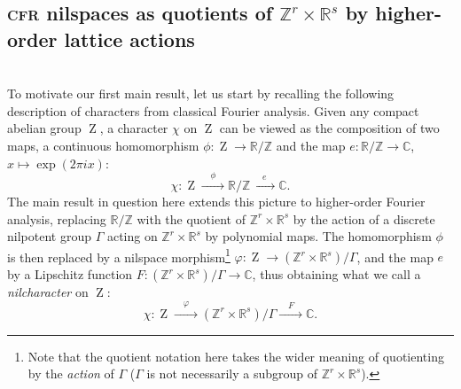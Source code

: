 \documentclass[a4paper,12pt,reqno]{amsart}
\theoremstyle{definition}
\def\to{\rightarrow}
\newcommand{\mb}{\mathbb}
\DeclareMathOperator{\ab}{Z}
\begin{document}
\subsection{\textsc{cfr} nilspaces as quotients of $\mb{Z}^r\times \mb{R}^s$ by higher-order lattice actions}\hfill\\
To motivate our first main result, let us start by recalling the following description of characters from classical Fourier analysis. Given any compact abelian group $\ab$, a character $\chi$ on $\ab$ can be viewed as the composition of two maps, a continuous homomorphism $\phi:\ab\to \mb{R}/\mb{Z}$ and the map $e:\mb{R}/\mb{Z}\to \mb{C}$, $x\mapsto \exp(2\pi i x)$:
\[
\chi:\ab \xrightarrow{\quad\phi\quad} \mb{R}/\mb{Z} \xrightarrow{\quad e\quad} \mb{C}.
\]
The main result in question here extends this picture to higher-order Fourier analysis, replacing $\mb{R}/\mb{Z}$ with the quotient of $\mb{Z}^r\times\mb{R}^s$ by the action of a discrete nilpotent group $\Gamma$ acting on $\mb{Z}^r\times\mb{R}^s$ by polynomial maps. The homomorphism $\phi$ is then replaced by a nilspace morphism\footnote{Note that the quotient notation here takes the wider meaning of quotienting by the \emph{action} of $\Gamma$ ($\Gamma$ is not necessarily a subgroup of $\mb{Z}^r\times\mb{R}^s$).} $\varphi:\ab\to (\mb{Z}^r\times\mb{R}^s)/\Gamma$, and the map $e$ by a Lipschitz function $F:(\mb{Z}^r\times\mb{R}^s)/\Gamma\to \mb{C}$, thus obtaining what we call a \emph{nilcharacter} on $\ab$:
\[
\chi:\ab \xrightarrow{\quad\varphi\quad} (\mb{Z}^r\times\mb{R}^s)/\Gamma \xrightarrow{\quad F\quad} \mb{C}. 
\]
\end{document}
